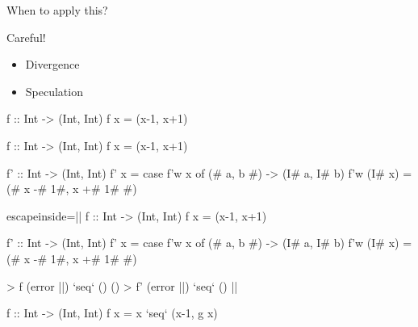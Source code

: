 \documentclass{haskellbeamer}
\begin{document}
\begin{frame}[fragile]{When to apply this?}
    \begin{minipage}{0.39\textwidth}
      Careful!
      \begin{itemize}
        \item<1-> Divergence
        \item<4-> Speculation
      \end{itemize}
    \end{minipage}%
    \begin{minipage}{0.6\textwidth}
      \begin{center}
        \begin{overprint}
          \begin{haskell}
            f :: Int -> (Int, Int)
            f x = (x-1, x+1)
          \end{haskell}
          \begin{haskell}
            f :: Int -> (Int, Int)
            f x = (x-1, x+1)
            
            f' :: Int -> (Int, Int)
            f' x = case f'w x of
              (# a, b #) -> (I# a, I# b)
            f'w (I# x) = (# x -# 1#, x +# 1# #)
          \end{haskell}
          \begin{haskell*}{escapeinside=||}
            f :: Int -> (Int, Int)
            f x = (x-1, x+1)
            
            f' :: Int -> (Int, Int)
            f' x = case f'w x of
              (# a, b #) -> (I# a, I# b)
            f'w (I# x) = (# x -# 1#, x +# 1# #)

            > f (error ||) `seq` ()
            ()
            > f' (error ||) `seq` ()
            ||
          \end{haskell*}
          \begin{haskell}
            f :: Int -> (Int, Int)
            f x = x `seq` (x-1, g x)




\end{haskell}
\end{overprint}
\end{center}
\end{minipage}
\end{frame}
\end{document}
